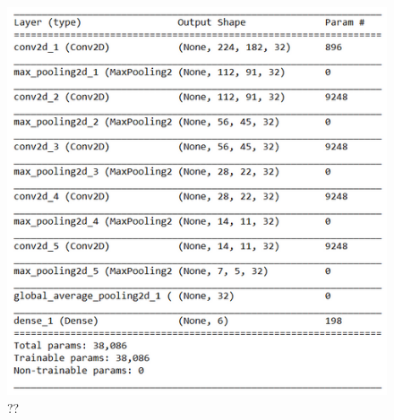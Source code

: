 \\
\begin{figure}[h]
	\centering
	\includegraphics[scale=0.6]{Figures/chapter04/multilabel_structure}
	\decoRule
	\caption[??]{??}
	\label{fig:MultilabelStructure}
\end{figure}

